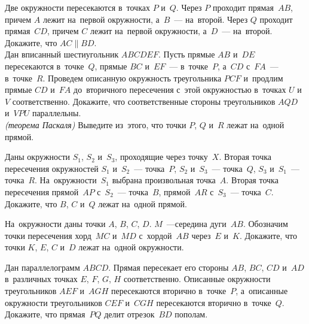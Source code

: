 \begin{problems}

\item
\sp
Две окружности пересекаются в~точках $P$ и~$Q$.
Через $P$ проходит прямая~$AB$, причем $A$ лежит на~первой окружности,
а~$B$~--- на~второй.
Через $Q$ проходит прямая~$CD$, причем $C$ лежит на~первой окружности,
а~$D$~--- на~второй.
Докажите, что $AC \parallel BD$.
\\
\sp
Дан вписанный шестиугольник $ABCDEF$.
Пусть прямые $AB$ и~$DE$ пересекаются в~точке~$Q$, прямые $BC$ и~$EF$~---
в~точке~$P$, а~$CD$ с~$FA$~--- в~точке~$R$.
Проведем описанную окружность треугольника $PCF$ и~продлим прямые $CD$ и~$FA$
до~вторичного пересечения с~этой окружностью в~точках $U$ и~$V$ соответственно.
Докажите, что соответственные стороны треугольников $AQD$ и~$VPU$ параллельны.
\\
\sp\emph{(теорема Паскаля)}
Выведите из~этого, что точки $P$, $Q$ и~$R$ лежат на~одной прямой.

\item
Даны окружности $S_1$, $S_2$ и~$S_3$, проходящие через точку~$X$.
Вторая точка пересечения окружностей $S_1$ и~$S_2$~--- точка~$P$,
$S_2$ и~$S_3$~--- точка~$Q$, $S_3$ и~$S_1$~--- точка~$R$.
На~окружности~$S_1$ выбрана произвольная точка~$A$.
Вторая точка пересечения прямой~$AP$ с~$S_2$~--- точка~$B$,
прямой~$AR$ с~$S_3$~--- точка~$C$.
Докажите, что $B$, $C$ и~$Q$ лежат на~одной прямой.

\item
На~окружности даны точки $A$, $B$, $C$, $D$.
$M$~---середина дуги~$AB$.
Обозначим точки пересечения хорд~$MC$ и~$MD$ с~хордой~$AB$ через~$E$ и~$K$.
Докажите, что точки $K$, $E$, $C$ и~$D$ лежат на~одной окружности.

\item
Дан параллелограмм $ABCD$.
Прямая пересекает его стороны $AB$, $BC$, $CD$ и~$AD$ в~различных точках
$E$, $F$, $G$, $H$ соответственно.
Описанные окружности треугольников $AEF$ и~$AGH$ пересекаются вторично
в~точке~$P$, а~описанные окружности треугольников $CEF$ и~$CGH$ пересекаются
вторично в~точке~$Q$.
Докажите, что прямая~$PQ$ делит отрезок~$BD$ пополам.



\end{problems}
